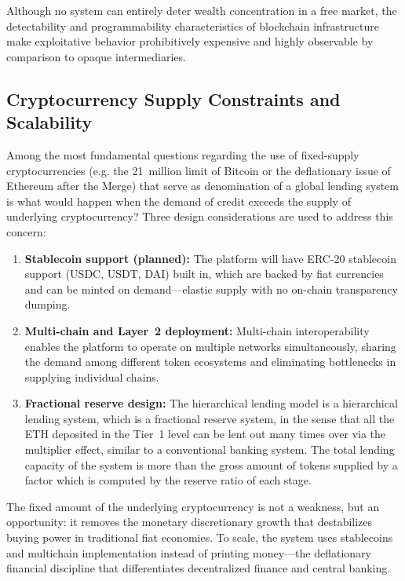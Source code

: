 \documentclass[12pt,a4paper]{report}
\begin{document}
Although no system can entirely deter wealth concentration in a free market, the detectability and programmability characteristics of blockchain infrastructure make exploitative behavior prohibitively expensive and highly observable by comparison to opaque intermediaries.

\subsection{Cryptocurrency Supply Constraints and Scalability}

Among the most fundamental questions regarding the use of fixed-supply cryptocurrencies (e.g. the 21~million limit of Bitcoin or the deflationary issue of Ethereum after the Merge) that serve as denomination of a global lending system is what would happen when the demand of credit exceeds the supply of underlying cryptocurrency? Three design considerations are used to address this concern:

\begin{enumerate}[noitemsep]
\item \textbf{Stablecoin support (planned):} The platform will have ERC-20 stablecoin support (USDC, USDT, DAI) built in, which are backed by fiat currencies and can be minted on demand---elastic supply with no on-chain transparency dumping.
\item \textbf{Multi-chain and Layer~2 deployment:} Multi-chain interoperability enables the platform to operate on multiple networks simultaneously, sharing the demand among different token ecosystems and eliminating bottlenecks in supplying individual chains.
\item \textbf{Fractional reserve design:} The hierarchical lending model is a hierarchical lending system, which is a fractional reserve system, in the sense that all the ETH deposited in the Tier~1 level can be lent out many times over via the multiplier effect, similar to a conventional banking system. The total lending capacity of the system is more than the gross amount of tokens supplied by a factor which is computed by the reserve ratio of each stage.
\end{enumerate}

The fixed amount of the underlying cryptocurrency is not a weakness, but an opportunity: it removes the monetary discretionary growth that destabilizes buying power in traditional fiat economies. To scale, the system uses stablecoins and multichain implementation instead of printing money---the deflationary financial discipline that differentiates decentralized finance and central banking.
\end{document}

